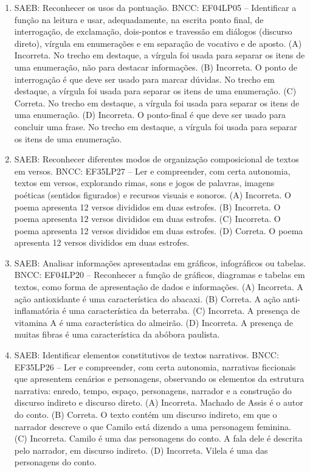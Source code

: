 \begin{enumerate}
\item
SAEB: Reconhecer os usos da pontuação. BNCC: EF04LP05 -- Identificar a função na leitura e usar, adequadamente, na escrita ponto final, de interrogação, de exclamação, dois-pontos e travessão em diálogos (discurso direto), vírgula em enumerações e em separação de vocativo e de aposto. 
(A) Incorreta. No trecho em destaque, a vírgula foi usada para separar os itens de uma enumeração, não para destacar informações. 
(B) Incorreta. O ponto de interrogação é que deve ser usado para marcar dúvidas. No trecho em destaque, a vírgula foi usada para separar os itens de uma enumeração. 
(C) Correta. No trecho em destaque, a vírgula foi usada para separar os itens de uma enumeração. 
(D) Incorreta. O ponto-final é que deve ser usado para concluir uma frase. No trecho em destaque, a vírgula foi usada para separar os itens de uma enumeração.

\item
SAEB: Reconhecer diferentes modos de organização composicional de textos em versos. BNCC: EF35LP27 -- Ler e compreender, com certa autonomia, textos em versos, explorando rimas, sons e jogos de palavras, imagens poéticas (sentidos figurados) e recursos visuais e sonoros. 
(A) Incorreta. O poema apresenta 12 versos divididos em duas estrofes. 
(B) Incorreta. O poema apresenta 12 versos divididos em duas estrofes. 
(C) Incorreta. O poema apresenta 12 versos divididos em duas estrofes. 
(D) Correta. O poema apresenta 12 versos divididos em duas estrofes.

\item
SAEB: Analisar informações apresentadas em gráficos, infográficos ou tabelas. BNCC: EF04LP20 -- Reconhecer a função de gráficos, diagramas e tabelas em textos, como forma de apresentação de dados e informações. 
(A) Incorreta. A ação antioxidante é uma característica do abacaxi. 
(B) Correta. A ação anti-inflamatória é uma característica da beterraba. 
(C) Incorreta. A presença de vitamina A é uma característica do almeirão. 
(D) Incorreta. A presença de muitas fibras é uma característica da abóbora paulista.

\item
SAEB: Identificar elementos constitutivos de textos narrativos. BNCC: EF35LP26 -- Ler e compreender, com certa autonomia, narrativas ficcionais que apresentem cenários e personagens, observando os elementos da estrutura narrativa: enredo, tempo, espaço, personagens, narrador e a construção do discurso indireto e discurso direto. 
(A) Incorreta. Machado de Assis é o autor do conto. 
(B) Correta. O texto contém um discurso indireto, em que o narrador descreve o que Camilo está dizendo a uma personagem feminina. 
(C) Incorreta. Camilo é uma das personagens do conto. A fala dele é descrita pelo narrador, em discurso indireto. 
(D) Incorreta. Vilela é uma das personagens do conto.


\end{enumerate}
